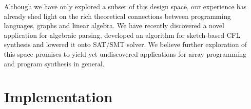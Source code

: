 \documentclass[sigplan,10pt,review,anonymous]{acmart}
\begin{document}
\begin{table}[H]
  \captionsetup{font=tiny}
  \vspace{10pt}
\caption{Where ATG are algebraically typed graphs, CFGG are context-free graph grammars, CP is a characteristic polynomial, STM is the subtyping machine, TLP is tabled logic programming, ADT is an algebraic data type, HOAS is higher order abstract syntax, KGs are knowledge graphs, NF is the Naperian functor, SQL is structured query language, TCAH is type-class algebra hierarchy and CFGL are context-free group languages. Entries highlighted in gray have been concretized by our DSL.}
\end{table}
\vspace{-10pt}
Although we have only explored a subset of this design space, our experience has already shed light on the rich theoretical connections between programming languages, graphs and linear algebra. We have recently discovered a novel application for algebraic parsing, developed an algorithm for sketch-based CFL synthesis and lowered it onto SAT/SMT solver. We believe further exploration of this space promises to yield yet-undiscovered applications for array programming and program synthesis in general.

\section{Implementation}
\end{document}
